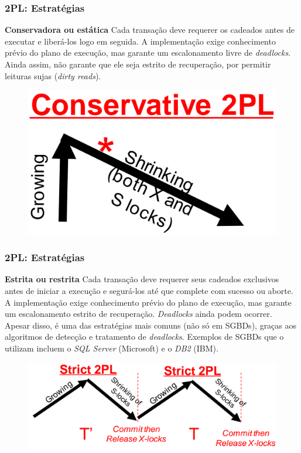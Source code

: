 \documentclass{beamer}
\begin{document}
\begin{frame} %
    \frametitle{2PL: Estratégias}
    
    \begin{block}{\textbf{Conservadora ou estática}}
        Cada transação deve requerer os cadeados antes de executar e liberá-los logo em seguida. A implementação exige conhecimento prévio do plano de execução, mas garante um escalonamento livre de \emph{deadlocks}. Ainda assim, não garante que ele seja estrito de recuperação, por permitir leituras sujas (\emph{dirty reads}).

        \medskip
        \begin{figure}
            \includegraphics[width=0.55\linewidth]{conservative2pl.png}
        \end{figure}
    \end{block}
\end{frame}


\begin{frame} %
    \frametitle{2PL: Estratégias}
    \begin{block}{\textbf{Estrita ou restrita}}
        Cada transação deve requerer seus cadeados exclusivos antes de iniciar a execução e segurá-los até que complete com sucesso ou aborte. A implementação exige conhecimento prévio do plano de execução, mas garante um escalonamento estrito de recuperação. \emph{Deadlocks} ainda podem ocorrer. Apesar disso, é uma das estratégias mais comuns (não só em SGBDs), graças aos algoritmos de detecção e tratamento de \emph{deadlocks}. Exemplos de SGBDs que o utilizam incluem o \emph{SQL Server} (Microsoft) e o \emph{DB2} (IBM).

        \medskip
        \begin{figure}
            \includegraphics[width=0.6\linewidth]{strict2pl.png}
        \end{figure}
    \end{block}
\end{frame}
\end{document}
